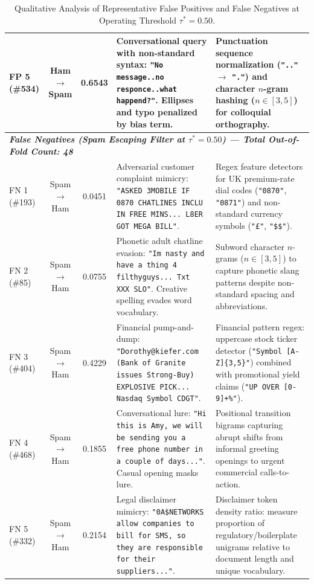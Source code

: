 \documentclass[10pt,onecolumn,letterpaper]{article}
\begin{document}
\begin{table}[htbp]
\begin{tabularx}{\textwidth}{l c c X X}
FP 5 (\#534) & Ham $\to$ Spam & 0.6543 & Conversational query with non-standard syntax: \texttt{"No message..no responce..what happend?"}. Ellipses and typo penalized by bias term. & Punctuation sequence normalization (\texttt{".."} $\to$ \texttt{"."}) and character $n$-gram hashing ($n \in [3, 5]$) for colloquial orthography. \\
\midrule
\multicolumn{5}{l}{\textit{\textbf{False Negatives (Spam Escaping Filter at $\tau^*=0.50$) --- Total Out-of-Fold Count: 48}}} \\
FN 1 (\#193) & Spam $\to$ Ham & 0.0451 & Adversarial customer complaint mimicry: \texttt{"ASKED 3MOBILE IF 0870 CHATLINES INCLU IN FREE MINS... L8ER GOT MEGA BILL"}. & Regex feature detectors for UK premium-rate dial codes (\texttt{"0870"}, \texttt{"0871"}) and non-standard currency symbols (\texttt{"£"}, \texttt{"\$\$"}). \\
FN 2 (\#85) & Spam $\to$ Ham & 0.0755 & Phonetic adult chatline evasion: \texttt{"Im nasty and have a thing 4 filthyguys... Txt XXX SLO"}. Creative spelling evades word vocabulary. & Subword character $n$-grams ($n \in [3, 5]$) to capture phonetic slang patterns despite non-standard spacing and abbreviations. \\
FN 3 (\#404) & Spam $\to$ Ham & 0.4229 & Financial pump-and-dump: \texttt{"Dorothy@kiefer.com (Bank of Granite issues Strong-Buy) EXPLOSIVE PICK... Nasdaq Symbol CDGT"}. & Financial pattern regex: uppercase stock ticker detector (\texttt{"Symbol [A-Z]\{3,5\}"}) combined with promotional yield claims (\texttt{"UP OVER [0-9]+\%"}). \\
FN 4 (\#468) & Spam $\to$ Ham & 0.1855 & Conversational lure: \texttt{"Hi this is Amy, we will be sending you a free phone number in a couple of days..."}. Casual opening masks lure. & Positional transition bigrams capturing abrupt shifts from informal greeting openings to urgent commercial calls-to-action. \\
FN 5 (\#332) & Spam $\to$ Ham & 0.2154 & Legal disclaimer mimicry: \texttt{"0A\$NETWORKS allow companies to bill for SMS, so they are responsible for their suppliers..."}. & Disclaimer token density ratio: measure proportion of regulatory/boilerplate unigrams relative to document length and unique vocabulary. \\
\bottomrule
\end{tabularx}
\caption{Qualitative Analysis of Representative False Positives and False Negatives at Operating Threshold $\tau^*=0.50$.}
\label{tab:error_forensics}
\end{table}
\end{document}
